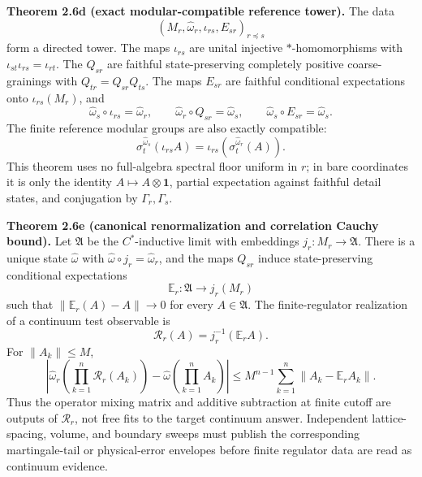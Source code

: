 \textbf{Theorem 2.6d (exact modular-compatible reference tower).}\label{thm:explicit-oph-reference-tower}
The data
\[
(M_r,\widehat\omega_r,\iota_{rs},E_{sr})_{r\preceq s}
\]
form a directed tower. The maps \(\iota_{rs}\) are unital injective
\(*\)-homomorphisms with \(\iota_{st}\iota_{rs}=\iota_{rt}\). The \(Q_{sr}\) are faithful
state-preserving completely positive coarse-grainings with \(Q_{tr}=Q_{sr}Q_{ts}\). The maps
\(E_{sr}\) are faithful conditional expectations onto \(\iota_{rs}(M_r)\), and
\[
\widehat\omega_s\circ\iota_{rs}=\widehat\omega_r,\qquad
\widehat\omega_r\circ Q_{sr}=\widehat\omega_s,\qquad
\widehat\omega_s\circ E_{sr}=\widehat\omega_s .
\]
The finite reference modular groups are also exactly compatible:
\[
\sigma_t^{\widehat\omega_s}(\iota_{rs}A)
=
\iota_{rs}(\sigma_t^{\widehat\omega_r}(A)).
\]
This theorem uses no full-algebra spectral floor uniform in \(r\); in bare coordinates it is only
the identity \(A\mapsto A\otimes\mathbf1\), partial expectation against faithful detail states,
and conjugation by \(\Gamma_r,\Gamma_s\).

\textbf{Theorem 2.6e (canonical renormalization and correlation Cauchy bound).}\label{thm:martingale-renormalization}
Let \(\mathfrak A\) be the \(C^\ast\)-inductive limit with embeddings \(j_r:M_r\to\mathfrak A\).
There is a unique state \(\widehat\omega\) with
\(\widehat\omega\circ j_r=\widehat\omega_r\), and the maps \(Q_{sr}\) induce
state-preserving conditional expectations
\[
\mathbb E_r:\mathfrak A\to j_r(M_r)
\]
such that \(\|\mathbb E_r(A)-A\|\to0\) for every \(A\in\mathfrak A\). The finite-regulator
realization of a continuum test observable is
\[
\mathcal R_r(A)=j_r^{-1}(\mathbb E_rA).
\]
For \(\|A_k\|\le M\),
\[
\left|
\widehat\omega_r\!\left(\prod_{k=1}^n\mathcal R_r(A_k)\right)
-
\widehat\omega\!\left(\prod_{k=1}^n A_k\right)
\right|
\le
M^{n-1}\sum_{k=1}^n\|A_k-\mathbb E_rA_k\|.
\]
Thus the operator mixing matrix and additive subtraction at finite cutoff are outputs of
\(\mathcal R_r\), not free fits to the target continuum answer. Independent lattice-spacing,
volume, and boundary sweeps must publish the corresponding martingale-tail or physical-error
envelopes before finite regulator data are read as continuum evidence.

